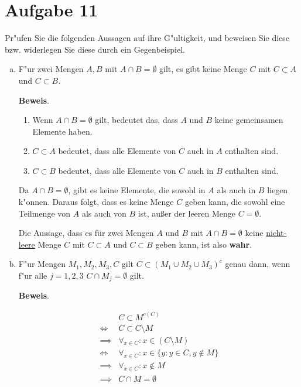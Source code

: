 \documentclass[10pt, a4paper, oneside]{article}
\begin{document}
\pagebreak

\section{Aufgabe 11}

Pr"ufen Sie die folgenden Aussagen auf ihre G"ultigkeit, und beweisen Sie diese
bzw. widerlegen Sie diese durch ein Gegenbeispiel.

\begin{enumerate}[(a)]
    \item F"ur zwei Mengen $A,B$ mit $A \cap B = \emptyset$ gilt, es gibt keine
        Menge $C$ mit $C \subset A$ und $C \subset B$.

        \textbf{Beweis}.
        \begin{enumerate}[-]
            \item Wenn $A \cap B = \emptyset$ gilt, bedeutet das, dass $A$ und $B$ keine gemeinsamen Elemente haben.
            \item $C \subset A$ bedeutet, dass alle Elemente von $C$ auch in $A$ enthalten sind.
            \item $C \subset B$ bedeutet, dass alle Elemente von $C$ auch in $B$ enthalten sind.
        \end{enumerate}

        Da $A \cap B = \emptyset$, gibt es keine Elemente, die sowohl
        in $A$ als auch in $B$ liegen k"onnen. Daraus folgt, dass es
        keine Menge $C$ geben kann, die sowohl eine Teilmenge von $A$
        als auch von $B$ ist, au{\ss}er der leeren Menge  $C =
        \emptyset$.

        Die Aussage, dass es für zwei Mengen $A$ und $B$ mit $A \cap B = \emptyset$
        keine \underline{nicht-leere} Menge $C$ mit $C \subset A$ und $C
        \subset B$ geben kann, ist also \textbf{wahr}.


    \item F"ur Mengen $M_1, M_2, M_3, C$ gilt $C \subset (M_1 \cup M_2 \cup
        M_3)^c$ genau dann, wenn f"ur alle $j = 1, 2, 3$ $C \cap M_j = \emptyset$
        gilt.

        \textbf{Beweis}.

        \begin{fleqn}
            \begin{align*}
                     &C \subset M^{c(C)} \\
                \iff &C \subset C \setminus M \\
            \implies &\forall_{x \in C} : x \in (C \setminus M) \\
                \iff &\forall_{x \in C} : x \in \{y : y \in C, y \notin M \} \\
            \implies &\forall_{x \in C} : x \notin M \\
            \implies &C \cap M = \emptyset
        \end{align*}
        \end{fleqn}


\end{enumerate}
\end{document}
